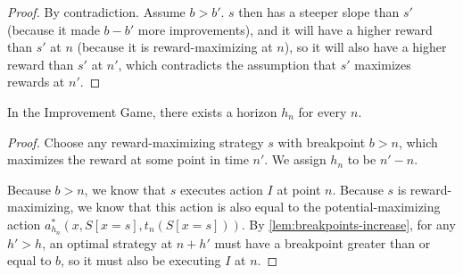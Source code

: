 \begin{proof}
  By contradiction. Assume $b > b'$. $s$ then has a steeper slope than $s'$
  (because it made $b - b'$ more improvements), and it will have a higher reward
  than $s'$ at $n$ (because it is reward-maximizing at $n$), so it will also
  have a higher reward than $s'$ at $n'$, which contradicts the assumption that
  $s'$ maximizes rewards at $n'$.
\end{proof}

\begin{theorem}
  In the Improvement Game, there exists a horizon $h_n$ for every $n$.
\end{theorem}

\begin{proof}
  Choose any reward-maximizing strategy $s$ with breakpoint $b > n$, which
  maximizes the reward at some point in time $n'$. We assign $h_n$ to be $n' -
    n$.

  Because $b > n$, we know that $s$ executes action $I$ at point $n$. Because
  $s$ is reward-maximizing, we know that this action is also equal to the
  potential-maximizing action $a^*_{h_n}(x,S[x=s],t_n(S[x=s]))$. By
  \cref{lem:breakpoints-increase}, for any $h' > h$, an optimal strategy at $n +
    h'$ must have a breakpoint greater than or equal to $b$, so it must also be
  executing $I$ at $n$.
\end{proof}